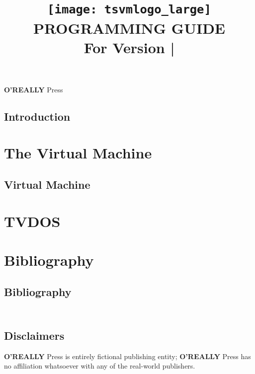 \documentclass[10pt, stock, openany, chapter]{memoir}
\title{\vskip56pt \texttt{[image: tsvmlogo\_large]} \vskip3pt \titlefont\Huge\textbf{PROGRAMMING GUIDE} \\ \Large \vspace{1.2em} For Version \tsvmver\hspace{0.75em}|\hspace{0.75em}\theedition}
\date{}
\author{}
\newcommand{\oreallypress}{\begingroup\hspace{0.083em}\large\textbf{O'REALLY\raisebox{1ex}{\scriptsize ?}} \large Press\endgroup}
\begin{document}
\maketitle{}
\thispagestyle{empty}
\vfill
\oreallypress

\newpage


\thispagestyle{empty}

\newpage

\setcounter{page}{3}
\tableofcontents*



\openright
\chapter{Introduction}

\openany

% 

\part{The Virtual Machine}

\chapter{Virtual Machine}


\part{TVDOS}


\part*{Bibliography}

\chapter*{Bibliography}


{
\let\clearpage\relax
\chapter*{\ \\ Disclaimers}

\oreallypress{} is entirely fictional publishing entity; \oreallypress{} has no affiliation whatsoever with any of the real-world publishers.

}
\end{document}
